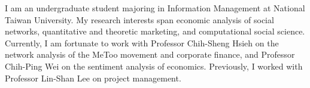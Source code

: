 

\begin{cvparagraph}

I am an undergraduate student majoring in Information Management 
at National Taiwan University. 
My research interests span economic analysis of social networks, 
quantitative and theoretic marketing, and computational social science.
Currently, I am fortunate to work with Professor Chih-Sheng Hsieh
on the network analysis of the MeToo movement and corporate finance,
and Professor Chih-Ping Wei on the sentiment analysis of economics.
Previously, I worked with Professor Lin-Shan Lee on project management.
\end{cvparagraph}
